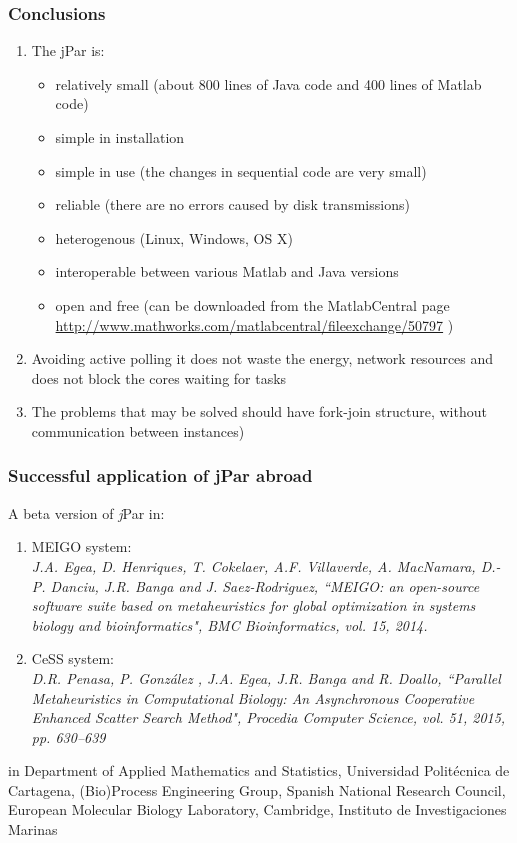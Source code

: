 \documentclass{beamer}
\begin{document}
\begin{frame}
\frametitle{Conclusions}
\begin{enumerate}
\item The jPar is:
\begin{itemize}
\item relatively small (about 800 lines of Java code and 400 lines of Matlab code)
\item simple in installation
    \item simple in use (the changes in sequential code are very small)
\item reliable (there are no errors caused by disk transmissions)
\item heterogenous (Linux, Windows, OS X)
\item interoperable between various Matlab and Java versions
 \item open and free (can be downloaded from the MatlabCentral page
     \url{http://www.mathworks.com/matlabcentral/fileexchange/50797} )
\end{itemize}
\newpage
\item Avoiding active
polling it does not waste the energy, network resources and does
not block the cores waiting for tasks
\item The problems that may be solved should have fork-join structure, without communication between instances)
  \end{enumerate}
\end{frame}
\begin{frame}
\frametitle{Successful application of jPar abroad}
A beta version of {\emph jPar}  in:
\begin{enumerate}
\item MEIGO system: \\
{\em J.A. Egea, D. Henriques, T. Cokelaer, A.F. Villaverde, A. MacNamara, D.-P. Danciu, J.R. Banga and J. Saez-Rodriguez, ``MEIGO: an open-source software suite based on metaheuristics for global optimization in systems biology and bioinformatics", BMC Bioinformatics, vol. 15,  2014.}
\item CeSS system:\\
{\em D.R. Penasa, P. Gonz\'{a}lez , J.A. Egea, J.R. Banga and R. Doallo,
``Parallel Metaheuristics in Computational Biology: An Asynchronous Cooperative Enhanced Scatter Search Method", Procedia Computer Science, vol. 51, 2015, pp.  630--639}
\end{enumerate}
in Department of Applied Mathematics and Statistics, Universidad Politécnica de Cartagena,
(Bio)Process Engineering Group, Spanish National Research Council,
European Molecular Biology Laboratory, Cambridge,
Instituto de Investigaciones Marinas
\end{frame}
\end{document}
